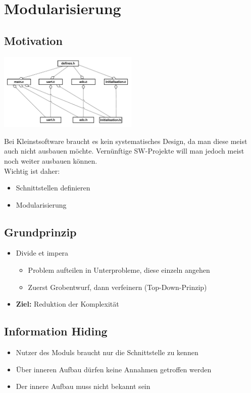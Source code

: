 \section{Modularisierung}
\subsection{Motivation }
\begin{center}
{\includegraphics[width=0.5\textwidth]{images/Modularisierung/SchlechtesBeispielModularisierung.png}}
\end{center}
Bei Kleinstsoftware braucht es kein systematisches Design, da man diese meist
auch nicht ausbauen möchte. Vernünftige SW-Projekte will man jedoch meist noch
weiter ausbauen können.\\
Wichtig ist daher:\\
\begin{itemize}
  \item Schnittstellen definieren
  \item Modularisierung
\end {itemize}
\subsection{Grundprinzip}
\begin{itemize}
  \item Divide et impera
  \begin{itemize}
    \item Problem aufteilen in Unterprobleme, diese einzeln angehen
    \item Zuerst Grobentwurf, dann verfeinern (Top-Down-Prinzip)
  \end{itemize}
  \item \textbf{Ziel:} Reduktion der Komplexität
\end{itemize}
\subsection{Information Hiding}
\begin{itemize}
  \item Nutzer des Moduls braucht nur die Schnittstelle zu kennen
  \item Über inneren Aufbau dürfen keine Annahmen getroffen werden
  \item Der innere Aufbau muss nicht bekannt sein
\end{itemize}
